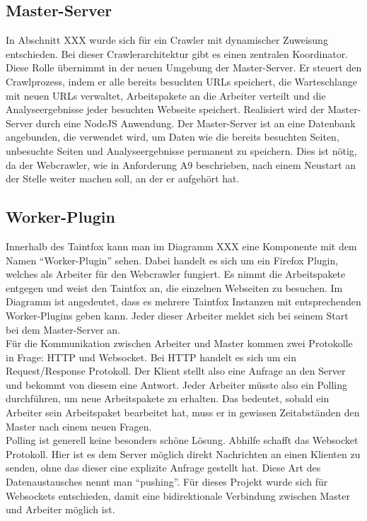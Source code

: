 \subsection{Master-Server}
In Abschnitt XXX wurde sich für ein Crawler mit dynamischer Zuweisung entschieden. Bei dieser Crawlerarchitektur gibt es einen zentralen Koordinator. Diese Rolle übernimmt in der neuen Umgebung der Master-Server. Er steuert den Crawlprozess, indem er alle bereits besuchten URLs speichert, die Warteschlange mit neuen URLs verwaltet, Arbeitspakete an die Arbeiter verteilt und die Analyseergebnisse jeder besuchten Webseite speichert. Realisiert wird der Master-Server durch eine NodeJS Anwendung. Der Master-Server ist an eine Datenbank angebunden, die verwendet wird, um Daten wie die bereits besuchten Seiten, unbesuchte Seiten und Analyseergebnisse permanent zu speichern. Dies ist nötig, da der Webcrawler, wie in Anforderung A9 beschrieben, nach einem Neustart an der Stelle weiter machen soll, an der er aufgehört hat.
\subsection{Worker-Plugin}
Innerhalb des Taintfox kann man im Diagramm XXX eine Komponente mit dem Namen \enquote{Worker-Plugin} sehen. Dabei handelt es sich um ein Firefox Plugin, welches als Arbeiter für den Webcrawler fungiert. Es nimmt die Arbeitspakete entgegen und weist den Taintfox an, die einzelnen Webseiten zu besuchen. Im Diagramm ist angedeutet, dass es mehrere Taintfox Instanzen mit entsprechenden Worker-Plugins geben kann. Jeder dieser Arbeiter meldet sich bei seinem Start bei dem Master-Server an. \\
Für die Kommunikation zwischen Arbeiter und Master kommen zwei Protokolle in Frage: HTTP und Websocket. Bei HTTP handelt es sich um ein Request/Response Protokoll. Der Klient stellt also eine Anfrage an den Server und bekommt von diesem eine Antwort. Jeder Arbeiter müsste also ein Polling durchführen, um neue Arbeitspakete zu erhalten. Das bedeutet, sobald ein Arbeiter sein Arbeitspaket bearbeitet hat, muss er in gewissen Zeitabständen den Master nach einem neuen Fragen. \\
Polling ist generell keine besonders schöne Lösung. Abhilfe schafft das Websocket Protokoll. Hier ist es dem Server möglich direkt Nachrichten an einen Klienten zu senden, ohne das dieser eine explizite Anfrage gestellt hat. Diese Art des Datenaustausches nennt man \enquote{pushing}. Für dieses Projekt wurde sich für Websockets entschieden, damit eine bidirektionale Verbindung zwischen Master und Arbeiter möglich ist.\\
